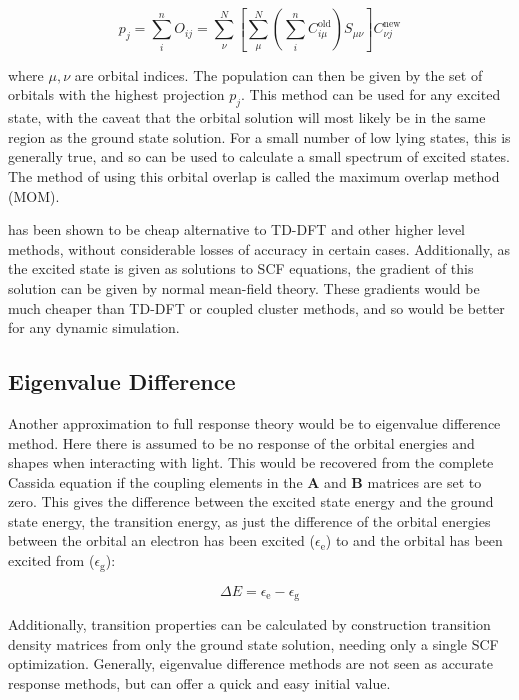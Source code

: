 \begin{equation}
p_j = \sum^n_i O_{ij} = \sum^N_\nu \left[\sum^N_\mu\left(\sum^n_i C_{i\mu}^{\text{old}}\right)S_{\mu\nu}\right]C^{\text{new}}_{\nu j}
\end{equation}

where $\mu,\nu$ are orbital indices. The population can then be given by the set
of orbitals with the highest projection $p_j$.  This method can be used for any
excited state, with the caveat that the orbital solution will most likely be in
the same region as the ground state solution. For a small number of low lying states,
this is generally  true, and so \dscf can be used to calculate a small spectrum of
excited states\cite{Gilbert2008}. The method of using this orbital overlap is called
the maximum overlap method (MOM).

\dscf has been shown to be cheap alternative to TD-DFT and other higher level
methods, without considerable losses of accuracy in certain cases.
Additionally, as the excited state is given as solutions to SCF equations,
the gradient of this solution can be given by normal mean-field theory.
These gradients would be much cheaper than TD-DFT or coupled cluster methods, and
so would be better for any dynamic simulation.

\subsection{Eigenvalue Difference}
\label{subsec:eigval_diff}
Another approximation to full response theory would be to eigenvalue difference method. 
Here there is assumed to be no response of the orbital energies and shapes when 
interacting with light. This would be recovered from the complete Cassida equation
if the coupling elements in the $\mathbf{A}$ and $\mathbf{B}$ matrices are set to zero.
This gives the difference between the excited state energy and the ground state
energy, the transition energy, as just the difference of the orbital energies between
the orbital an electron has been excited ($\epsilon_{\text{e}}$) to and the orbital
has been excited from ($\epsilon_{\text{g}}$):

\begin{equation}
\Delta E = \epsilon_{\text{e}} - \epsilon_{\text{g}}
\end{equation}

Additionally, transition properties can be calculated by construction transition 
density matrices from only the ground state solution, needing only a single SCF optimization. 
Generally, eigenvalue difference methods are not seen as accurate response methods,
but can offer a quick and easy initial value\cite{Gimon2009}.

